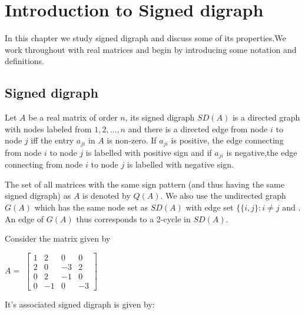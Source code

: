 \chapter{Introduction to Signed digraph }
In this chapter we study signed digraph and discuss some of its properties.We work throughout with real matrices and begin by introducing some notation and definitions.
\section{Signed digraph}
\begin{dfn}
	Let $A$ be a real matrix of order $n$, its signed digraph $SD(A)$ is a directed graph with nodes labeled from ${1,2,\dots,n}$ and there is a directed edge from node $i$ to node $j$ iff the entry $a_{ji}$ in $A$ is non-zero.\newline
	 If $a_{ji}$ is positive, the edge connecting from node $i$ to node $j$ is labelled with positive sign and if $a_{ji}$ is negative,the edge connecting from node $i$ to node $j$ is labelled with negative sign.
	
\end{dfn}
  The set of all matrices with the same sign pattern (and thus having the same signed digraph) as $A$ is denoted by $Q(A)$. We also use the undirected graph $G(A)$ which has the same node set as $SD(A)$ with edge set $\{\{i,j\}:i\neq j \text{ and }$. An edge of $G(A)$ thus corresponds to a 2-cycle in $SD(A)$.
  
  \begin{example}
  	Consider the matrix given by
  	 \begin{center}
  		$ A =$ 
  	$	\begin{bmatrix}
  			1 & 2 & 0 & 0\\
  			2 & 0 & -3 & 2\\
  			0 & 2 & -1 & 0 \\
  			0 & -1 & 0 & -3
  		\end{bmatrix}$
  	\end{center} 
  
  It's associated signed digraph is given by:
  \begin{center}
  \end{center}

  
  \end{example}

